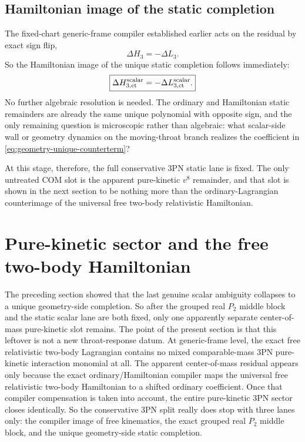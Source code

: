 \documentclass[11pt]{article}
\begin{document}
\subsection{Hamiltonian image of the static completion}
\label{sec:geometry-hamiltonian-image}

The fixed-chart generic-frame compiler established earlier acts on the residual
by exact sign flip,
\begin{equation}
\Delta H_3=-\Delta L_3.
\label{eq:geometry-sign-flip}
\end{equation}
So the Hamiltonian image of the unique static completion follows immediately:
\begin{equation}
\boxed{
\Delta H_{3,\rm ct}^{\rm scalar}
=
-\Delta L_{3,\rm ct}^{\rm scalar}.
}
\label{eq:geometry-hamiltonian-image-eq}
\end{equation}
No further algebraic resolution is needed.  The ordinary and Hamiltonian static
remainders are already the same unique polynomial with opposite sign, and the
only remaining question is microscopic rather than algebraic: what scalar-side
wall or geometry dynamics on the moving-throat branch realizes the coefficient in
\eqref{eq:geometry-unique-counterterm}?

At this stage, therefore, the full conservative $3$PN static lane is fixed.  The
only untreated COM slot is the apparent pure-kinetic $v^8$ remainder, and that
slot is shown in the next section to be nothing more than the ordinary-Lagrangian
counterimage of the universal free two-body relativistic Hamiltonian.


\section{Pure-kinetic sector and the free two-body Hamiltonian}
\label{sec:kinetic}

The preceding section showed that the last genuine scalar ambiguity collapses to a
unique geometry-side completion.  So after the grouped real $P_2$ middle block
and the static scalar lane are both fixed, only one apparently separate
center-of-mass pure-kinetic slot remains.  The point of the present section is
that this leftover is not a new throat-response datum.  At generic-frame level,
the exact free relativistic two-body Lagrangian contains no mixed comparable-mass
$3$PN pure-kinetic interaction monomial at all.  The apparent center-of-mass
residual appears only because the exact ordinary/Hamiltonian compiler maps the
universal free relativistic two-body Hamiltonian to a shifted ordinary
coefficient.  Once that compiler compensation is taken into account, the entire
pure-kinetic $3$PN sector closes identically.  So the conservative $3$PN split
really does stop with three lanes only: the compiler image of free kinematics,
the exact grouped real $P_2$ middle block, and the unique geometry-side static
completion.
\end{document}
